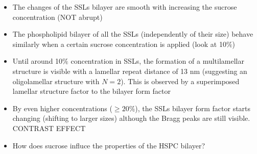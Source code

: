 \begin{itemize}

\item The changes of the SSLs bilayer are smooth with increasing the sucrose concentration (NOT abrupt)

\item The phospholipid bilayer of all the SSLs (independently of their size) behave similarly when a certain sucrose concentration is applied (look at 10$\%$)

\item Until around 10$\%$ concentration in SSLs, the formation of a multilamellar structure is visible with a lamellar repeat distance of 13 nm (suggesting an oligolamellar structure with $N=2$). This is observed by a superimposed lamellar structure factor to the bilayer form factor

\item By even higher concentrations ($\geq20\%$), the SSLs bilayer form factor starts changing (shifting to larger sizes) although the Bragg peaks are still visible. CONTRAST EFFECT



\item How does sucrose influce the properties of the HSPC bilayer? \cite{kiselev_does_2003, kiselev_sucrose_2001, kiselev_sucrose_2001-1}

\end{itemize}



